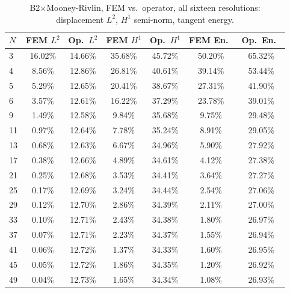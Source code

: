\documentclass[11pt]{article}
\begin{document}
\begin{table}[h]
\centering
\caption{B2$\times$Mooney-Rivlin, FEM vs.\ operator, all sixteen
  resolutions: displacement $L^2$, $H^1$ semi-norm, tangent energy.}
\label{tab:s2-b2mr-a}
\scriptsize
\begin{tabular}{lcccccc}
\toprule
$N$ & FEM $L^2$ & Op.\ $L^2$ & FEM $H^1$ & Op.\ $H^1$ & FEM En.\ & Op.\ En.\ \\
\midrule
3  & 16.02\% & 14.66\% & 35.68\% & 45.72\% & 50.20\% & 65.32\% \\
4  & 8.56\%  & 12.86\% & 26.81\% & 40.61\% & 39.14\% & 53.44\% \\
5  & 5.29\%  & 12.65\% & 20.41\% & 38.67\% & 27.31\% & 41.90\% \\
6  & 3.57\%  & 12.61\% & 16.22\% & 37.29\% & 23.78\% & 39.01\% \\
9  & 1.49\%  & 12.58\% & 9.84\%  & 35.68\% & 9.75\%  & 29.48\% \\
11 & 0.97\%  & 12.64\% & 7.78\%  & 35.24\% & 8.91\%  & 29.05\% \\
13 & 0.68\%  & 12.63\% & 6.67\%  & 34.96\% & 5.90\%  & 27.92\% \\
17 & 0.38\%  & 12.66\% & 4.89\%  & 34.61\% & 4.12\%  & 27.38\% \\
21 & 0.25\%  & 12.68\% & 3.53\%  & 34.41\% & 3.64\%  & 27.27\% \\
25 & 0.17\%  & 12.69\% & 3.24\%  & 34.44\% & 2.54\%  & 27.06\% \\
29 & 0.12\%  & 12.70\% & 2.86\%  & 34.39\% & 2.11\%  & 27.00\% \\
33 & 0.10\%  & 12.71\% & 2.43\%  & 34.38\% & 1.80\%  & 26.97\% \\
37 & 0.07\%  & 12.71\% & 2.23\%  & 34.37\% & 1.55\%  & 26.94\% \\
41 & 0.06\%  & 12.72\% & 1.37\%  & 34.33\% & 1.60\%  & 26.95\% \\
45 & 0.05\%  & 12.72\% & 1.86\%  & 34.35\% & 1.20\%  & 26.92\% \\
49 & 0.04\%  & 12.73\% & 1.65\%  & 34.34\% & 1.08\%  & 26.93\% \\
\bottomrule
\end{tabular}
\end{table}
\end{document}
